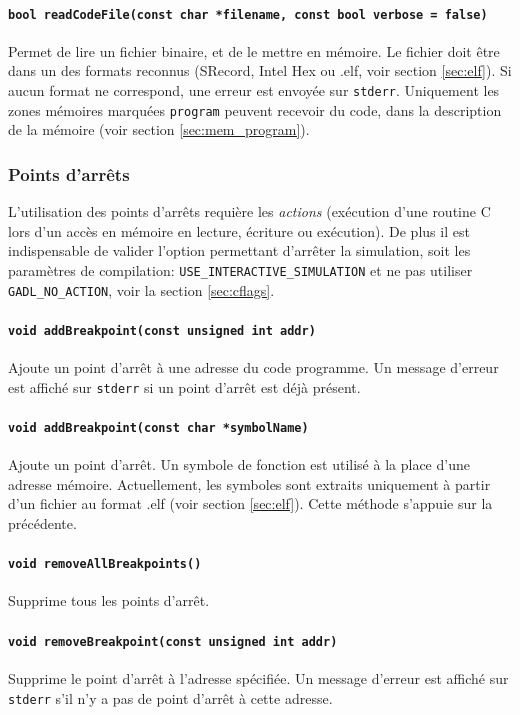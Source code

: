 \paragraph{\texttt{bool readCodeFile(const char *filename, const bool verbose = false)}} Permet de lire un fichier binaire, et de le mettre en mémoire. Le fichier doit être dans un des formats reconnus (SRecord, Intel Hex ou .elf, voir section \ref{sec:elf}). Si aucun format ne correspond, une erreur est envoyée sur \texttt{stderr}. Uniquement les zones mémoires marquées \texttt{program} peuvent recevoir du code, dans la description de la mémoire (voir section \ref{sec:mem_program}).

\subsubsection{Points d'arrêts}
L'utilisation des points d'arrêts requière les \emph{actions} (exécution d'une routine C lors d'un accès en mémoire en lecture, écriture ou exécution). De plus il est indispensable de valider l'option permettant d'arrêter la simulation, soit les paramètres de compilation: \texttt{USE\_INTERACTIVE\_SIMULATION} et ne pas utiliser \texttt{GADL\_NO\_ACTION}, voir la section \ref{sec:cflags}.
\paragraph{\texttt{void addBreakpoint(const unsigned int addr)}} Ajoute un point d'arrêt à une adresse du code programme. Un message d'erreur est affiché sur \texttt{stderr} si un point d'arrêt est déjà présent.
\paragraph{\texttt{void addBreakpoint(const char *symbolName)}} Ajoute un point d'arrêt. Un symbole de fonction est utilisé à la place d'une adresse mémoire. Actuellement, les symboles sont extraits uniquement à partir d'un fichier au format .elf (voir section \ref{sec:elf}). Cette méthode s'appuie sur la précédente.
\paragraph{\texttt{void removeAllBreakpoints()}} Supprime tous les points d'arrêt.
\paragraph{\texttt{void removeBreakpoint(const unsigned int addr)}} Supprime le point d'arrêt à l'adresse spécifiée. Un message d'erreur est affiché sur \texttt{stderr} s'il n'y a pas de point d'arrêt à cette adresse.
